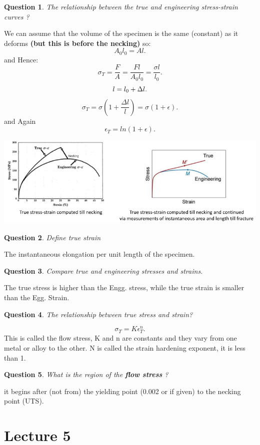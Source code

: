 \documentclass[13]{article}
\newtheorem{exer}{Question}
\begin{document}
\begin{exer}
The relationship between the true and engineering stress-strain curves ?
\end{exer}
We can assume that the volume of the specimen is the same (constant) as it deforms \textbf{(but this is before the necking)}  so:
\[
A_0l_0 = Al
.\] 
and Hence:
\[
\sigma_T = \frac{F}{A} = \frac{Fl}{A_0l_0} = \frac{\sigma l}{l_0}
.\] 
\[
l = l_0+\Delta l \\ 
.\] 
\[
\sigma_T = \sigma (1+\frac{\Delta l}{l}) = \sigma (1+ \epsilon)
.\]
and Again
\[
	\epsilon_T = ln(1+ \epsilon)
.\] 
\begin{center}
\includegraphics[scale=0.5]{figures/8.png}
\end{center}
\begin{exer}
Define true strain
\end{exer}
The instantaneous elongation per unit length of the specimen.
\begin{exer}
Compare true and engineering stresses and strains.
\end{exer}
The true stress is higher than the Engg. stress, while the true strain is smaller than the Egg. Strain.
\begin{exer}
The relationship between true stress and strain?
\end{exer}
\[
\sigma_T = K \epsilon_T^n
.\] 
This is called the flow stress, K and n are constants and they vary from one metal or alloy to the other. N is called the strain hardening exponent, it is less than 1. 
\begin{exer}
What is the region of the \textbf{flow stress} ?
\end{exer}
it begins after (not from) the yielding point (0.002 or if given) to the necking point (UTS). 





\section{Lecture 5}
\end{document}
